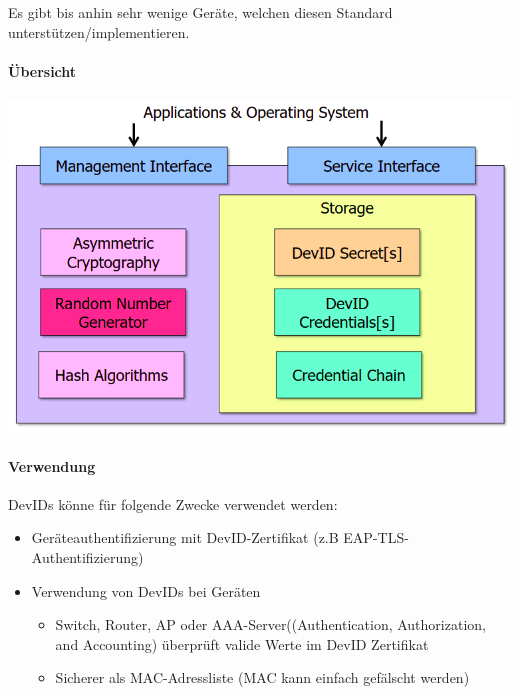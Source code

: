 Es gibt bis anhin sehr wenige Geräte, welchen diesen Standard unterstützen/implementieren.

\paragraph{Übersicht} \hfill
\newline
\begin{minipage}[t]{1\textwidth}
    \centering
	\includegraphics[width=0.7\linewidth]{images/devID-module.png}
\end{minipage}

\paragraph{Verwendung}
DevIDs könne für folgende Zwecke verwendet werden:
\begin{itemize}
    \item Geräteauthentifizierung mit DevID-Zertifikat (z.B EAP-TLS-Authentifizierung)
    \item Verwendung von DevIDs bei Geräten
    \begin{itemize}
        \item Switch, Router, AP oder AAA-Server((Authentication, Authorization, and Accounting) überprüft valide Werte im DevID Zertifikat
        \item Sicherer als MAC-Adressliste (MAC kann einfach gefälscht werden)
    \end{itemize}
\end{itemize}

